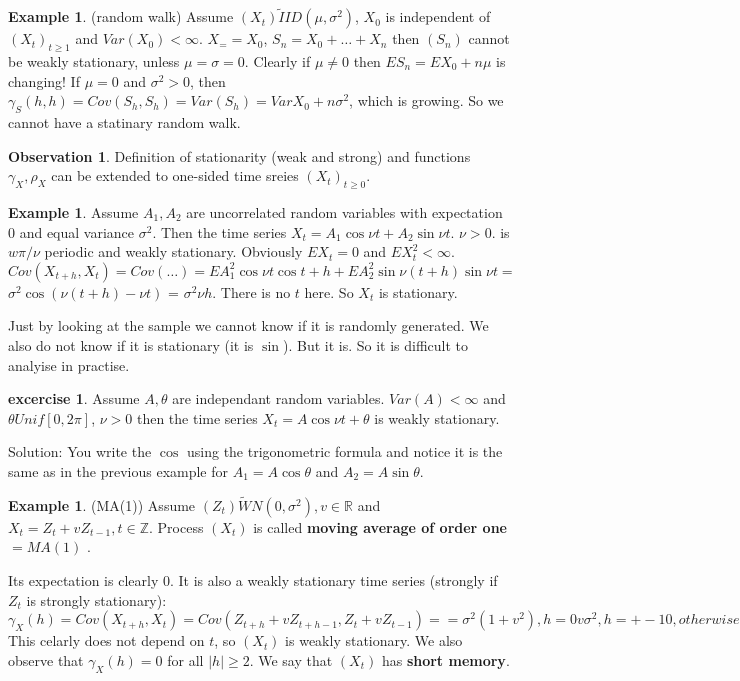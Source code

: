 \documentclass[12pt,a4paper]{amsart}
\theoremstyle{definition} %
\newtheorem{example}[defn]{Example}
\newtheorem{excercise}[defn]{excercise}
\newtheorem{observation}[defn]{Observation}
\theoremstyle{plain} %
\newcommand{\R}{\mathbb R}
\newcommand{\Z}{\mathbb Z}
\begin{document}
\begin{example} (random walk)
Assume $(X_t) \tilde IID(\mu, \sigma^2)$, $X_0$ is independent of $(X_t)_{t \geq 1}$ and $Var(X_0) < \infty$.
$X_= = X_0$, $S_n = X_0 + \dots + X_n$ then $(S_n)$ cannot be weakly stationary, unless $\mu = \sigma = 0$.
Clearly if $\mu \neq 0$ then $ES_n = EX_0 + n\mu$ is changing!
If $\mu = 0$ and $\sigma^2 > 0$, then $\gamma_S(h,h) = Cov(S_h, S_h) = Var(S_h) = VarX_0 + n\sigma^2$, which is growing. So we cannot have a statinary random walk.
\end{example}

\begin{observation}
Definition of stationarity (weak and strong) and functions $\gamma_X, \rho_X$ can be extended to one-sided time sreies $(X_t)_ {t\geq 0}$. 
\end{observation}


\begin{example}
Assume $A_1, A_2$ are uncorrelated random variables with expectation $0$ and equal variance $\sigma^2$. Then the time series $X_t = A_1 \cos{\nu t} +A_2 \sin{\nu t}$. $\nu > 0$.
is $w\pi / \nu$ periodic and weakly stationary.
Obviously $EX_t = 0$ and $EX_t^2 < \infty$.
$Cov(X_{t+h}, X_t) = Cov(\dots) = E A_1^2 \cos{\nu t}\cos{t + h} + EA_2^2 \sin{\nu(t + h)}\sin{\nu t} = $
$\sigma^2 \cos(\nu (t + h) - \nu t)$ = $\sigma^2 \nu h$.
There is no $t$ here. So $X_t$ is stationary. 

Just by looking at the sample we cannot know if it is randomly generated. We also do not know if it is stationary (it is $\sin$).
But it is. So it is difficult to analyise in practise.
\end{example}


\begin{excercise}
Assume $A, \theta$ are independant random variables. $Var(A) < \infty$ and $\theta Unif[0,2\pi]$, $\nu > 0$ then the time series
$X_t = A \cos{\nu t + \theta}$ is weakly stationary. 

Solution:
You write the $\cos$ using the trigonometric formula and notice it is the same as in the previous example for 
$A_1 = A\cos{\theta}$ and $A_2 = A\sin{\theta}$.
\end{excercise}

\begin{example} (MA(1))
Assume $(Z_t) \tilde WN(0, \sigma^2), v \in \R$
and $X_t = Z_t + vZ_{t-1}, t \in \Z$.
Process $(X_t)$ is called {\bf moving average of order one} $= MA(1)$ .

Its expectation is clearly $0$. It is also a weakly stationary time series (strongly if $Z_t$ is strongly stationary):
$\gamma_X(h) = Cov(X_{t + h}, X_t) = Cov(Z_{t+h} + vZ_{t+h-1}, Z_t + vZ_{t-1}) = 
=  \sigma^2(1 + v^2)   , h = 0
	v \sigma^2	 , h = +-1
		0	, otherwise
$
This celarly does not depend on $t$, so $(X_t)$ is weakly stationary. We also observe that $\gamma_X(h) = 0$ for all $|h| \geq 2$. We say that $(X_t)$ has {\bf short memory}.

\end{example}
\end{document}
